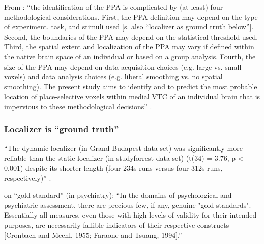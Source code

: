 
%
From \citep{weiner2018defining}: ``the identification of the PPA is complicated
by (at least) four methodological considerations.
%
First, the PPA definition may depend on the type of experiment, task, and
stimuli used [s. also ``localizer as ground truth below''].
%
Second, the boundaries of the PPA may depend on the statistical threshold used.
%
Third, the spatial extent and localization of the PPA may vary if defined within
the native brain space of an individual or based on a group analysis.
%
Fourth, the size of the PPA may depend on data acquisition choices (e.g. large
vs. small voxels) and data analysis choices (e.g. liberal smoothing vs. no
spatial smoothing).
%
The present study aims to identify and to predict the most probable location of
place-selective voxels within medial VTC of an individual brain that is
impervious to these methodological decisions'' \citep{weiner2018defining}.





\subsubsection{Localizer is ``ground truth''}


%
``The dynamic localizer (in Grand Budapest data set) was significantly more
reliable than the static localizer (in studyforrest data set) (t(34) = 3.76, p <
0.001) despite its shorter length (four 234s runs versus four 312s runs,
respectively)'' \citep{jiahui2020predicting}.

%
\citet{lilienfeld2015fifty} on ``gold standard'' (in psychiatry):
%
``In the domains of psychological and psychiatric assessment, there are precious
few, if any, genuine "gold standards".
%
Essentially all measures, even those with high levels of validity for their
intended purposes, are necessarily fallible indicators of their respective
constructs [Cronbach and Meehl, 1955; Faraone and Tsuang, 1994].''
\citep{lilienfeld2015fifty}

